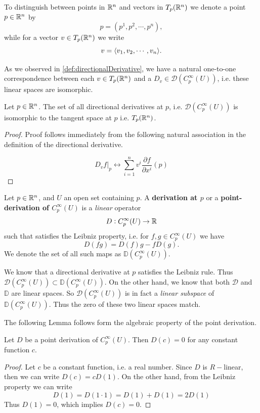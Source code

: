 To distinguish between points in $ \mathbb{R}^n $ and vectors in $ T_p(\mathbb{R}^n) $ we denote a point $ p\in\mathbb{R}^n $ by 
\[ p = (p^1, p^2, \cdots, p^n), \]
while for a vector $ v \in T_p(\mathbb{R}^n) $ we write
\[ v = \langle  v_1,v_2,\cdots,v_n \rangle. \]

As we observed in \autoref{def:directionalDerivative}, we have a natural one-to-one correspondence between each $  v\in T_p(\mathbb{R}^n) $ and a $ D_v \in \mathcal{D}(C_p^\infty(U)) $, i.e. these linear spaces are isomorphic.

\begin{proposition}
	Let $ p \in\mathbb{R}^n $. The set of all directional derivatives at $ p $, i.e. $ \mathcal{D}(C_p^\infty(U)) $ is isomorphic to the tangent space at $ p $ i.e. $ T_p(\mathbb{R}^n) $.
\end{proposition}
\begin{proof}
	Proof follows immediately from the following natural association in the definition of the directional derivative.
	
	\[ D_v f \big|_p \longleftrightarrow \sum_{i=1}^{n} v^i \frac{\partial f}{\partial x^i}(p) \]
\end{proof}



\begin{definition}
	\label{def:pointDerivation}
	Let $ p \in \mathbb{R}^n $, and $ U $ an open set containing $ p $. A \textbf{derivation at $ p $} or a \textbf{point-derivation of $ C_p^\infty(U) $} is a \emph{linear} operator
	\[ D: C_p^\infty(U) \to \mathbb{R} \]
	such that satisfies the Leibniz property, i.e. for $ f,g \in C_p^\infty(U) $ we have
	\[ D(fg) = D(f)g - fD(g). \]
	We denote the set of all such maps as $ \mathbb{D}(C_p^\infty(U)) $.
\end{definition}

\begin{remark}
	We know that a directional derivative at $ p $ satisfies the Leibniz rule. Thus $ \mathcal{D}(C_p^\infty(U)) \subset \mathbb{D}(C_p^\infty(U))$. On the other hand, we know that both $ \mathcal{D} $ and $ \mathbb{D} $ are linear spaces. So $ \mathcal{D}(C_p^\infty(U)) $ is in fact a \emph{linear subspace} of $\mathbb{D}(C_p^\infty(U))$. Thus the zero of these two linear spaces match.
\end{remark}


The following Lemma follows form the algebraic property of the point derivation.

\begin{lemma}
	\label{lem:PointDerivationOfConstantFunction}
	Let $ D $ be a point derivation of $ C_p^\infty(U)$. Then $ D(c) = 0 $ for any constant function  $ c $. 
\end{lemma}
\begin{proof}
	Let $ c $ be a constant function, i.e. a real number. Since $ D $ is $ R- $linear, then we can write $ D(c) = c D(1). $ On the other hand, from the Leibniz property we can write
	\[ D(1) = D(1 \cdot 1) = D(1) + D(1) = 2D(1) \]
	Thus $ D(1) = 0 $, which implies $ D(c) = 0 $.
\end{proof}

